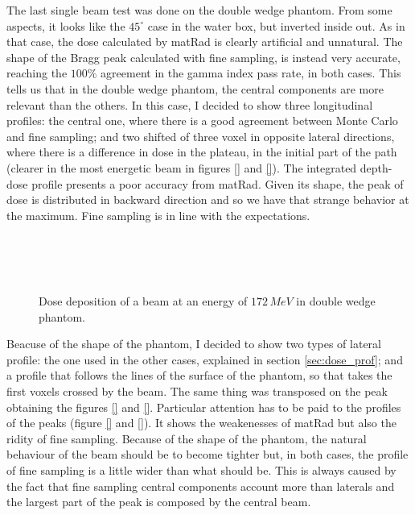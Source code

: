 \documentclass[12pt, a4paper, twoside]{book}
\begin{document}
The last single beam test was done on the double wedge phantom. From some aspects, it looks like the $45^\circ$ case in the water box, but inverted inside out. As in that case, the dose calculated by matRad is clearly artificial and unnatural. The shape of the Bragg peak calculated with fine sampling, is instead very accurate, reaching the $100\%$ agreement in the gamma index pass rate, in both cases. 
This tells us that in the double wedge phantom, the central components are more relevant than the others.
In this case, I decided to show three longitudinal profiles: the central one, where there is a good agreement between Monte Carlo and fine sampling; and two shifted of three voxel in opposite lateral directions, where there is a difference in dose in the plateau, in the initial part of the path (clearer in the most energetic beam in figures \ref{} and \ref{}).
The integrated depth-dose profile presents a poor accuracy from matRad. Given its shape, the peak of dose is distributed in backward direction and so we have that strange behavior at the maximum. Fine sampling is in line with the expectations. 
\begin{figure}[!t]
\centering
{}\\ 
\\
\\
\caption{Dose deposition of a beam at an energy of $172\,MeV$ in double wedge phantom.}
\label{fig:DW2}
\end{figure}
Beacuse of the shape of the phantom, I decided to show two types of lateral profile: the one used in the other cases, explained in section \ref{sec:dose_prof}; and a profile that follows the lines of the surface of the phantom, so that takes the first voxels crossed by the beam. The same thing was transposed on the peak obtaining the figures \ref{} and \ref{}.
Particular attention has to be paid to the profiles of the peaks (figure \ref{} and \ref{}). It shows the weakenesses of matRad but also the ridity of fine sampling. Because of the shape of the phantom, the natural behaviour of the beam should be to become tighter but, in both cases, the profile of fine sampling is a little wider than what should be. This is always caused by the fact that fine sampling central components account more than laterals and the largest part of the peak is composed by the central beam.
\end{document}

